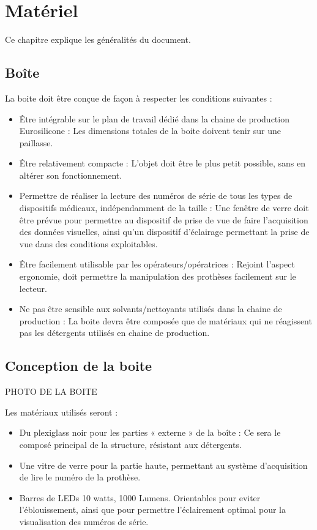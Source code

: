 \chapter{Matériel}

Ce chapitre explique les généralités du document.

\section{Boîte}

La boite doit être conçue de façon à respecter les conditions suivantes :
\begin{itemize}
    \item Être intégrable sur le plan de travail dédié dans la chaine de production Eurosilicone : Les dimensions totales de la boite doivent tenir sur une paillasse.
    \item Être relativement compacte : L’objet doit être le plus petit possible, sans en altérer son fonctionnement.
    \item Permettre de réaliser la lecture des numéros de série de tous les types de dispositifs médicaux, indépendamment de la taille : Une fenêtre de verre doit être prévue pour permettre au dispositif de prise de vue de faire l’acquisition des données visuelles, ainsi qu’un dispositif d’éclairage permettant la prise de vue dans des conditions exploitables.
    \item Être facilement utilisable par les opérateurs/opératrices : Rejoint l’aspect ergonomie, doit permettre la manipulation des prothèses facilement sur le lecteur.
    \item Ne pas être sensible aux solvants/nettoyants utilisés dans la chaine de production : La boite devra être composée que de matériaux qui ne réagissent pas les détergents utilisés en chaine de production.
\end{itemize}

\section{Conception de la boite}

PHOTO DE LA BOITE

Les matériaux utilisés seront :
\begin{itemize}
    \item Du plexiglass noir pour les parties « externe » de la boîte : Ce sera le composé principal de la structure, résistant aux détergents.
    \item Une vitre de verre pour la partie haute, permettant au système d’acquisition de lire le numéro de la prothèse.
    \item Barres de LEDs 10 watts, 1000 Lumens. Orientables pour eviter l'éblouissement, ainsi que pour permettre l'éclairement optimal pour la visualisation des numéros de série.
\end{itemize}

